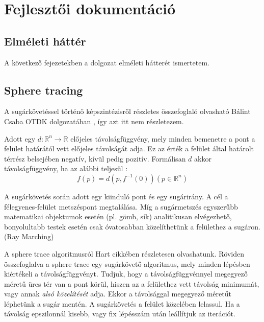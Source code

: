 \chapter{Fejlesztői dokumentáció}
\label{ch:developer}


\section{Elméleti háttér}

A következő fejezetekben a dolgozat elméleti hátterét ismertetem. 

\section{Sphere tracing}

A sugárkövetéssel történő képszintézisről részletes összefoglaló olvasható Bálint Csaba OTDK dolgozatában \cite[11-16. o.]{BalintCsaba}, így azt itt nem részletezem.

Adott egy $d:\mathbb{R}^n\rightarrow\mathbb{R}$ előjeles távolságfüggvény, mely minden bemenetre a pont a felület határától vett előjeles távolságát adja. Ez az érték a felület által határolt térrész belsejében negatív, kívül pedig pozitív. Formálisan $d$ akkor távolságfüggvény, ha az alábbi teljesül \cite{Hart1996}:
$$f(p) = d(p, f^{-1}(0)) (p \in \mathbb{R}^n)$$

A sugárkövetés során adott egy kiinduló pont és egy sugárirány. A cél a félegyenes-felület metszéspont megtalálása. Míg a sugármetszés egyszerűbb matematikai objektumok esetén (pl. gömb, sík) analitikusan elvégezhető, bonyolultabb testek esetén csak óvatosabban közelíthetünk a felülethez a sugáron. (Ray Marching\cite{RayMarching})

A sphere trace algoritmusról Hart cikkében \cite{Hart1996} részletesen olvashatunk. Röviden összefoglalva a sphere trace egy sugárkövető algoritmus, mely minden lépésben kiértékeli a távolságfüggvényt. Tudjuk, hogy a távolságfüggvénnyel megegyező méretű üres tér van a pont körül, hiszen az a felülethez vett távolság minimumát, vagy annak \emph{alsó közelítését} adja. Ekkor a távolsággal megegyező méretűt léphetünk a sugár mentén. A sugárkövetés a felület közelében lelassul. Ha a távolság epszilonnál kisebb, vagy fix lépésszám után leállítjuk az iterációt.  


